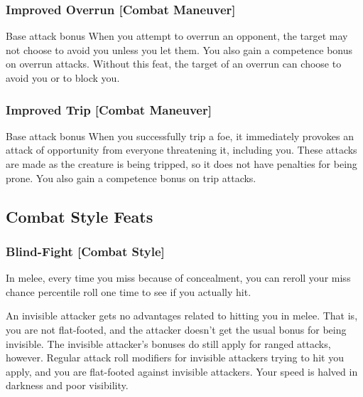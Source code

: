 \subsubsection{Improved Overrun [Combat Maneuver]}
 Base attack bonus 
 When you attempt to overrun an opponent, the target may not choose to avoid you unless you let them. You also gain a  competence bonus on overrun attacks.
 Without this feat, the target of an overrun can choose to avoid you or to block you.

\begin{comment}
\subsubsection{Improved Sunder [Combat Maneuver]}
\parhead{Prerequisites} Base attack bonus \plus4
\parhead{Benefit} When you strike at an object held or carried by an opponent (such as a weapon or shield), you ignore half the hardness of the sundered item. You also gain a \plus2 competence bonus on sunder attacks.
\end{comment}

\subsubsection{Improved Trip [Combat Maneuver]}
 Base attack bonus 
 When you successfully trip a foe, it immediately provokes an attack of opportunity from everyone threatening it, including you. These attacks are made as the creature is being tripped, so it does not have penalties for being prone. You also gain a  competence bonus on trip attacks.

\subsection{Combat Style Feats}

\subsubsection{Blind-Fight [Combat Style]}
 In melee, every time you miss because of concealment, you can reroll your miss chance percentile roll one time to see if you actually hit.
\par An invisible attacker gets no advantages related to hitting you in melee. That is, you are not flat-footed, and the attacker doesn't get the usual  bonus for being invisible. The invisible attacker's bonuses do still apply for ranged attacks, however.
 Regular attack roll modifiers for invisible attackers trying to hit you apply, and you are flat-footed against invisible attackers. Your speed is halved in darkness and poor visibility.

